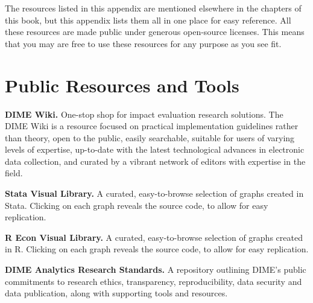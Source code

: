 
\newcommand{\resourcepar}{\vspace{.75\baselineskip}\noindent}


\begin{fullwidth}

The resources listed in this appendix
are mentioned elsewhere in the chapters of this book,
but this appendix lists them all
in one place for easy reference.
All these resources are made public
under generous open-source licenses.
This means that you may are free to use these resources
for any purpose as you see fit.

\end{fullwidth}


\section{Public Resources and Tools}

\textbf{DIME Wiki.}
One-stop shop for impact evaluation research solutions.
The DIME Wiki is a resource focused on
practical implementation guidelines rather than theory,
open to the public, easily searchable,
suitable for users of varying levels of expertise,
up-to-date with the latest technological advances
in electronic data collection,
and curated by a vibrant network of editors
with expertise in the field.

\resourcepar\textbf{Stata Visual Library.}
A curated, easy-to-browse selection of graphs created in Stata.
Clicking on each graph reveals the source code,
to allow for easy replication.

\resourcepar\textbf{R Econ Visual Library.}
A curated, easy-to-browse selection of graphs created in R.
Clicking on each graph reveals the source code,
to allow for easy replication.

\resourcepar\textbf{DIME Analytics Research Standards.}
A repository outlining DIME's public commitments to
research ethics, transparency, reproducibility,
data security and data publication,
along with supporting tools and resources.



